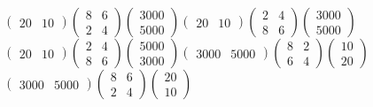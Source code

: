 \begin{minipage}[t]{\dimexpr\linewidth-2mm\relax}
\begin{choicesv}{$\begin{pmatrix} 20 & 10 \end{pmatrix}\begin{pmatrix} 8 & 6 \\ 2 & 4 \end{pmatrix}\begin{pmatrix} 3000 \\ 5000 \end{pmatrix}$}{$\begin{pmatrix} 20 & 10 \end{pmatrix}\begin{pmatrix} 2 & 4 \\ 8 & 6 \end{pmatrix}\begin{pmatrix} 3000 \\ 5000 \end{pmatrix}$}{$\begin{pmatrix} 20 & 10 \end{pmatrix}\begin{pmatrix} 2 & 4 \\ 8 & 6 \end{pmatrix}\begin{pmatrix} 5000 \\ 3000 \end{pmatrix}$}{$\begin{pmatrix} 3000 & 5000 \end{pmatrix}\begin{pmatrix} 8 & 2 \\ 6 & 4 \end{pmatrix}\begin{pmatrix} 10 \\ 20 \end{pmatrix}$}{$\begin{pmatrix} 3000 & 5000 \end{pmatrix}\begin{pmatrix} 8 & 6 \\ 2 & 4 \end{pmatrix}\begin{pmatrix} 20 \\ 10 \end{pmatrix}$}\end{choicesv}\end{minipage}
